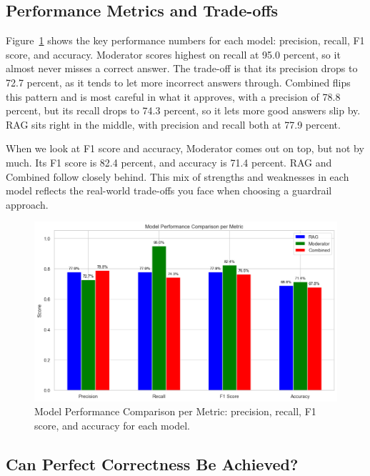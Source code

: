 \subsection{Performance Metrics and Trade-offs}

Figure~\ref{fig:model_performance_comparison_per_metric} shows the key performance numbers for each model: precision, recall, F1 score, and accuracy. Moderator scores highest on recall at 95.0 percent, so it almost never misses a correct answer. The trade-off is that its precision drops to 72.7 percent, as it tends to let more incorrect answers through. Combined flips this pattern and is most careful in what it approves, with a precision of 78.8 percent, but its recall drops to 74.3 percent, so it lets more good answers slip by. RAG sits right in the middle, with precision and recall both at 77.9 percent.

When we look at F1 score and accuracy, Moderator comes out on top, but not by much. Its F1 score is 82.4 percent, and accuracy is 71.4 percent. RAG and Combined follow closely behind. This mix of strengths and weaknesses in each model reflects the real-world trade-offs you face when choosing a guardrail approach.

\begin{figure}[ht]
  \centering
  \includegraphics[width=0.95\linewidth]{figures/model_performance comparison_per_metric.png}
  \caption{Model Performance Comparison per Metric: precision, recall, F1 score, and accuracy for each model.}
  \label{fig:model_performance_comparison_per_metric}
\end{figure}

\subsection{Can Perfect Correctness Be Achieved?}

